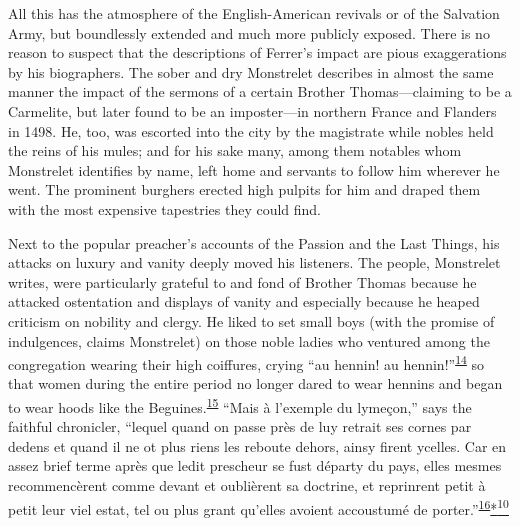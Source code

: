 All this has the atmosphere of the English-American revivals or of the
Salvation Army, but boundlessly extended and much more publicly exposed.
There is no reason to suspect that the descriptions of Ferrer's impact
are pious exaggerations by his biographers. The sober and dry Monstrelet
describes in almost the same manner the impact of the sermons of a
certain Brother Thomas---claiming to be a Carmelite, but later found to
be an imposter---in northern France and Flanders in 1498. He, too, was
escorted into the city by the magistrate while nobles held the reins of
his mules; and for his sake many, among them notables whom Monstrelet
identifies by name, left home and servants to follow him wherever he
went. The prominent burghers erected high pulpits for him and draped
them with the most expensive tapestries they could find.

Next to the popular preacher's accounts of the Passion and the Last
Things, his attacks on luxury and vanity deeply moved his listeners. The
people, Monstrelet writes, were particularly grateful to and fond of
Brother Thomas because he attacked ostentation and displays of vanity
and especially because he heaped criticism on nobility and clergy. He
liked to set small boys (with the promise of indulgences, claims
Monstrelet) on those noble ladies who ventured among the congregation
wearing their high coiffures, crying ``au hennin! au
hennin!''\textsuperscript{\protect\hypertarget{08_Chapter_One__THE_PASSIONATE_INTE.xhtmlux5cux23id_2202}{\protect\hyperlink{23_NOTES.xhtmlux5cux23id_2203}{14}}}
so that women during the entire period no longer dared to wear hennins
and began to wear hoods like the
Beguines.\textsuperscript{\protect\hypertarget{08_Chapter_One__THE_PASSIONATE_INTE.xhtmlux5cux23id_2200}{\protect\hyperlink{23_NOTES.xhtmlux5cux23id_2201}{15}}}
``Mais à l'exemple du lymeçon,'' says the faithful chronicler, ``lequel
quand on passe près de luy retrait ses cornes par dedens et quand il ne
ot plus riens les reboute dehors, ainsy firent ycelles. Car en assez
brief terme après que ledit prescheur se fust départy du pays, elles
mesmes recommencèrent comme devant et
\protect\hypertarget{08_Chapter_One__THE_PASSIONATE_INTE.xhtmlux5cux23page_7}{}{}oublièrent
sa doctrine, et reprinrent petit à petit leur viel estat, tel ou plus
grant qu'elles avoient accoustumé de
porter.''\textsuperscript{\protect\hypertarget{08_Chapter_One__THE_PASSIONATE_INTE.xhtmlux5cux23id_2198}{\protect\hyperlink{23_NOTES.xhtmlux5cux23id_2199}{16}}}\protect\hypertarget{08_Chapter_One__THE_PASSIONATE_INTE.xhtmlux5cux23id_2267}{\protect\hyperlink{23_NOTES.xhtmlux5cux23id_2266}{*\textsuperscript{10}}}


